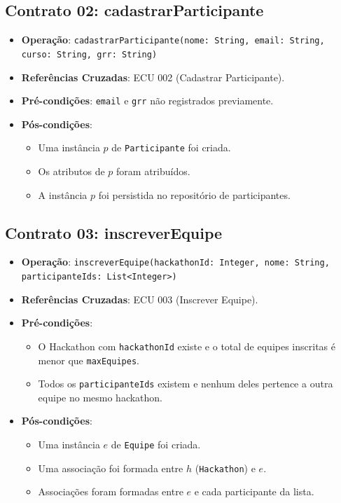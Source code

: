 \documentclass[12pt]{article}
\begin{document}
\subsection{Contrato 02: cadastrarParticipante}
\begin{itemize}
    \item \textbf{Operação}: \texttt{cadastrarParticipante(nome: String, email: String, curso: String, grr: String)}
    \item \textbf{Referências Cruzadas}: ECU 002 (Cadastrar Participante).
    \item \textbf{Pré-condições}: \texttt{email} e \texttt{grr} não registrados previamente.
    \item \textbf{Pós-condições}:
    \begin{itemize}
        \item Uma instância $p$ de \texttt{Participante} foi criada.
        \item Os atributos de $p$ foram atribuídos.
        \item A instância $p$ foi persistida no repositório de participantes.
    \end{itemize}
\end{itemize}

\subsection{Contrato 03: inscreverEquipe}
\begin{itemize}
    \item \textbf{Operação}: \texttt{inscreverEquipe(hackathonId: Integer, nome: String, participanteIds: List<Integer>)}
    \item \textbf{Referências Cruzadas}: ECU 003 (Inscrever Equipe).
    \item \textbf{Pré-condições}:
    \begin{itemize}
        \item O Hackathon com \texttt{hackathonId} existe e o total de equipes inscritas é menor que \texttt{maxEquipes}.
        \item Todos os \texttt{participanteIds} existem e nenhum deles pertence a outra equipe no mesmo hackathon.
    \end{itemize}
    \item \textbf{Pós-condições}:
    \begin{itemize}
        \item Uma instância $e$ de \texttt{Equipe} foi criada.
        \item Uma associação foi formada entre $h$ (\texttt{Hackathon}) e $e$.
        \item Associações foram formadas entre $e$ e cada participante da lista.
    \end{itemize}
\end{itemize}
\end{document}
